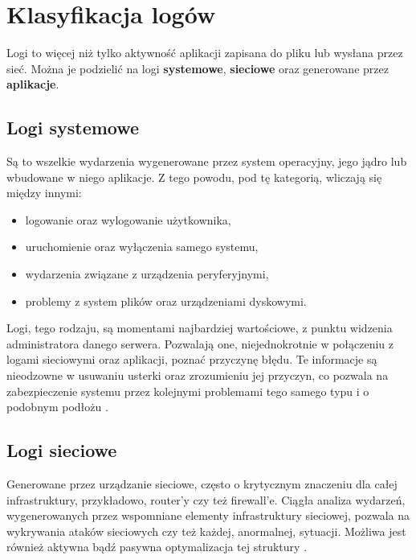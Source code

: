 \section{Klasyfikacja logów}
\label{chapter:logs:classification}

Logi to więcej niż tylko aktywność aplikacji zapisana do pliku lub wysłana przez sieć.
Można je podzielić na logi \textbf{systemowe}, \textbf{sieciowe} oraz generowane przez \textbf{aplikacje}.

    \subsection{Logi systemowe}
    \label{chapter:logs:classification:system}
    Są to wszelkie wydarzenia wygenerowane przez system operacyjny, jego jądro lub 
    wbudowane w niego aplikacje. Z tego powodu, pod tę kategorią, wliczają się między innymi:
    \begin{itemize}
        \item logowanie oraz wylogowanie użytkownika,
        \item uruchomienie oraz wyłączenia samego systemu,
        \item wydarzenia związane z urządzenia peryferyjnymi,
        \item problemy z system plików oraz urządzeniami dyskowymi.
    \end{itemize}
    Logi, tego rodzaju, są momentami najbardziej wartościowe, z punktu widzenia administratora
    danego serwera. Pozwalają one, niejednokrotnie w połączeniu z logami sieciowymi oraz 
    aplikacji, poznać przyczynę błędu. Te informacje są nieodzowne w usuwaniu usterki
    oraz zrozumieniu jej przyczyn, co pozwala na zabezpieczenie systemu przez kolejnymi
    problemami tego samego typu i o podobnym podłożu \cite{logging_log_management}.
    
    \subsection{Logi sieciowe}
    \label{chapter:logs:classification:network}
    Generowane przez urządzanie sieciowe, często o krytycznym znaczeniu dla całej infrastruktury, 
    przykładowo, router'y czy też firewall'e. Ciągła analiza wydarzeń, wygenerowanych przez 
    wspomniane elementy infrastruktury sieciowej, pozwala na wykrywania ataków sieciowych
    czy też każdej, anormalnej, sytuacji. Możliwa jest również aktywna bądź pasywna 
    optymalizacja tej struktury \cite{logging_log_management}. 
    
